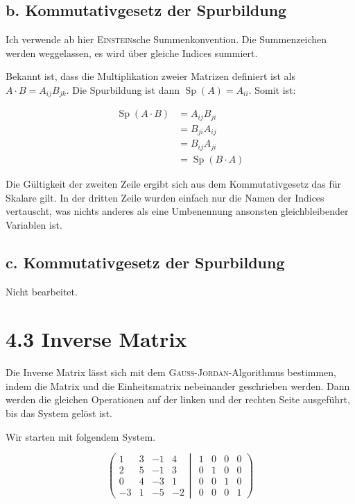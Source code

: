 \documentclass[a4paper,german,12pt,smallheadings]{scrartcl}
\begin{document}
\subsection*{b. Kommutativgesetz der Spurbildung}
Ich verwende ab hier \textsc{Einstein}sche Summenkonvention. Die Summenzeichen
werden weggelassen, es wird über gleiche Indices summiert.

Bekannt ist, dass die Multiplikation zweier Matrizen definiert ist als $A \cdot
B = A_{ij} B_{jk}$. Die Spurbildung ist dann $\operatorname{Sp}(A) = A_{ii}$.
Somit ist:

\begin{align*}
\operatorname{Sp}(A \cdot B) &=  A_{ij} B_{ji} \\
&= B_{ji} A_{ij} \\
&= B_{ij} A_{ji} \\
&= \operatorname{Sp}(B \cdot A)
\end{align*}

Die Gültigkeit der zweiten Zeile ergibt sich aus dem Kommutativgesetz das für
Skalare gilt. In der dritten Zeile wurden einfach nur die Namen der Indices
vertauscht, was nichts anderes als eine Umbenennung ansonsten gleichbleibender
Variablen ist.

\subsection*{c. Kommutativgesetz der Spurbildung}
Nicht bearbeitet.

\section*{4.3 Inverse Matrix}

Die Inverse Matrix lässt sich mit dem \textsc{Gauß}-\textsc{Jordan}-Algorithmus
bestimmen, indem die Matrix und die Einheitsmatrix nebeinander geschrieben
werden. Dann werden die gleichen Operationen auf der linken und der rechten
Seite ausgeführt, bis das System gelöst ist.

Wir starten mit folgendem System.

\begin{equation*}
\left(
 \begin{matrix}
 1 & 3 & -1 & 4 \\
 2 & 5 & -1 & 3 \\
 0 & 4 & -3 & 1 \\
 -3 & 1 & -5 & -2
 \end{matrix}
 \left|
  \hspace{5pt}
  \begin{matrix}
  1 & 0 & 0 & 0 \\
  0 & 1 & 0 & 0 \\
  0 & 0 & 1 & 0 \\
  0 & 0 & 0 & 1
  \end{matrix}
 \right)
\right.
\end{equation*}
\end{document}
